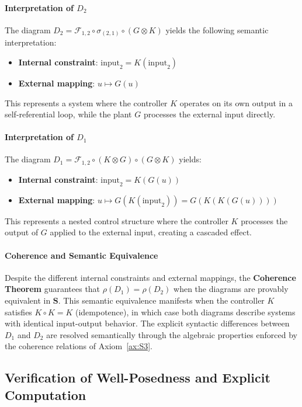 \documentclass[11pt]{article}
\begin{document}
\paragraph{Interpretation of $D_2$}
The diagram $D_2 = \mathcal{F}_{1,2} \circ \sigma_{(2,1)} \circ (G \otimes K)$ yields the following semantic interpretation:
\begin{itemize}
    \item \textbf{Internal constraint}: $\text{input}_2 = K(\text{input}_2)$
    \item \textbf{External mapping}: $u \mapsto G(u)$
\end{itemize}
This represents a system where the controller $K$ operates on its own output in a self-referential loop, while the plant $G$ processes the external input directly.

\paragraph{Interpretation of $D_1$} 
The diagram $D_1 = \mathcal{F}_{1,2} \circ (K \otimes G) \circ (G \otimes K)$ yields:
\begin{itemize}
    \item \textbf{Internal constraint}: $\text{input}_2 = K(G(u))$
    \item \textbf{External mapping}: $u \mapsto G(K(\text{input}_2)) = G(K(K(G(u))))$
\end{itemize}
This represents a nested control structure where the controller $K$ processes the output of $G$ applied to the external input, creating a cascaded effect.

\paragraph{Coherence and Semantic Equivalence}
Despite the different internal constraints and external mappings, the \textbf{Coherence Theorem} guarantees that $\rho(D_1) = \rho(D_2)$ when the diagrams are provably equivalent in $\mathbf{S}$. This semantic equivalence manifests when the controller $K$ satisfies $K \circ K = K$ (idempotence), in which case both diagrams describe systems with identical input-output behavior. The explicit syntactic differences between $D_1$ and $D_2$ are resolved semantically through the algebraic properties enforced by the coherence relations of Axiom~\ref{ax:S3}.

\subsection{Verification of Well-Posedness and Explicit Computation}
\end{document}
